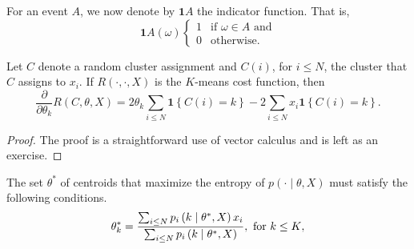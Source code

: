 For an event $A$, we now denote by $\mathbf{1}{A}$ the indicator function. That is,
%
\begin{equation}
\mathbf{1}{A}(\omega)
\begin{cases}
1 & \text{if $\omega \in A$ and}\\
0 & \text{otherwise}.
\end{cases}
\end{equation}
%

\begin{lemma}
Let $C$ denote a random cluster assignment and $C(i)$, for $i \leq N$,
the cluster that $C$ assigns to $x_i$. If $R(\cdot, \cdot, X)$ is the $K$-means cost function, then
%
\begin{equation}
\frac{\partial}{\partial \theta_k} R(C, \theta, X) = 2\theta_k \sum_{i \leq N} \mathbf{1}\left\{C(i) = k\right\} - 2\sum_{i \leq N} x_i \mathbf{1}\left\{C(i) = k\right\}.
\label{eq:deriv_cost_fun_da}
\end{equation}
%
\end{lemma}

\begin{proof}
The proof is a straightforward use of vector calculus and is left as
an exercise.
\end{proof}

\begin{theorem}
The set $\theta^*$ of centroids that maximize the entropy of $p(\cdot \mid \theta, X)$ must satisfy the following conditions.
%
\begin{equation}
\theta^*_k = \frac{\sum_{i \leq N} p_{i} \left(k\mid \theta^*, X\right)x_i}{\sum_{i \leq N} p_{i} \left(k\mid \theta^*, X\right)},\text{ for $k \leq K$},
\label{eq:thm_stationarity_conds_centroids_da}
\end{equation}
%
\label{thm:centroid_stationarity_cond}
\end{theorem}

